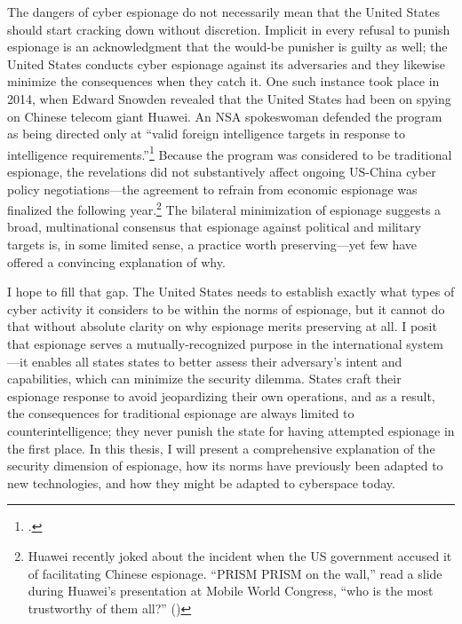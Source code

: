 \documentclass{memoir}
\begin{document}
\begin{refsegment}
The dangers of cyber espionage do not necessarily mean that the United States should start cracking down without discretion. Implicit in every refusal to punish espionage is an acknowledgment that the would-be punisher is guilty as well; the United States conducts cyber espionage against its adversaries and they likewise minimize the consequences when they catch it. One such instance took place in 2014, when Edward Snowden revealed that the United States had been on spying on Chinese telecom giant Huawei. An NSA spokeswoman defended the program as being directed only at ``valid foreign intelligence targets in response to intelligence requirements.''\footcite{nakashima_nsa_2014} Because the program was considered to be traditional espionage, the revelations did not substantively affect ongoing US-China cyber policy negotiations---the agreement to refrain from economic espionage was finalized the following year.\footnote{Huawei recently joked about the incident when the US government accused it of facilitating Chinese espionage. ``PRISM PRISM on the wall,'' read a slide during Huawei's presentation at Mobile World Congress, ``who is the most trustworthy of them all?'' (\cite{nicola_huawei_2019})} The bilateral minimization of espionage suggests a broad, multinational consensus that espionage against political and military targets is, in some limited sense, a practice worth preserving---yet few have offered a convincing explanation of why.


I hope to fill that gap. The United States needs to establish exactly what types of cyber activity it considers to be within the norms of espionage, but it cannot do that without absolute clarity on why espionage merits preserving at all. I posit that espionage serves a mutually-recognized purpose in the international system---it enables all states states to better assess their adversary's intent and capabilities, which can minimize the security dilemma. States craft their espionage response to avoid jeopardizing their own operations, and as a result, the consequences for traditional espionage are always limited to counterintelligence; they never punish the state for having attempted espionage in the first place. In this thesis, I will present a comprehensive explanation of the security dimension of espionage, how its norms have previously been adapted to new technologies, and how they might be adapted to cyberspace today.


\end{refsegment}
\end{document}
